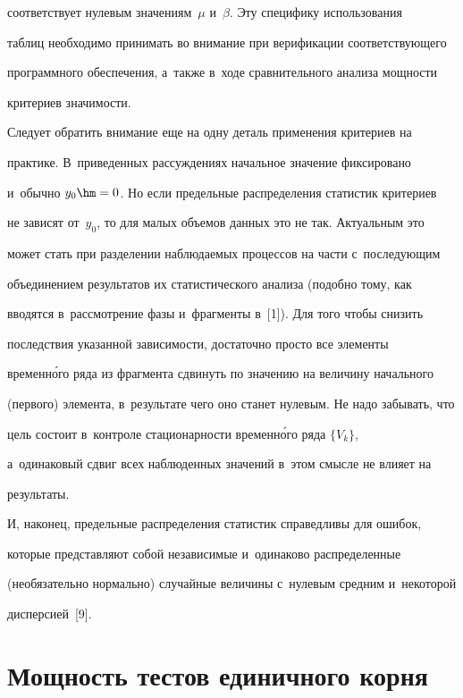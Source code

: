 соответствует нулевым значениям~$\mu$ и~$\beta$. Эту специфику использования 


таб\-лиц необходимо принимать во внимание при верификации со\-от\-вет\-ст\-ву\-юще\-го 


программного обеспечения, а~также в~ходе сравнительного анализа мощ\-ности 


критериев зна\-чи\-мости.


     


     Следует обратить внимание еще на одну деталь применения критериев на 


практике. В~приведенных рас\-суж\-де\-ни\-ях начальное значение фиксировано 


и~обычно $y_0\hm=0$. Но если предельные распределения статистик критериев 


не зависят от~$y_0$, то для малых объемов данных это не так. Актуальным это 


может стать при разделении наблюдаемых процессов на части с~по\-сле\-ду\-ющим 


объединением результатов их статистического анализа (подобно тому, как 


вводятся в~рас\-смот\-ре\-ние фазы и~фрагменты в~[1]). Для того чтобы снизить 


последствия указанной за\-ви\-си\-мости, до\-ста\-точ\-но прос\-то все элементы 


временн\'{о}го ряда из фрагмента сдвинуть по значению на величину начального 


(первого) элемента, в~результате чего оно станет нулевым. Не надо забывать, что 


цель со\-сто\-ит в~контроле стационарности временн\'{о}го ряда $\{V_k\}$, 


а~одинаковый сдвиг всех наблюденных значений в~этом смыс\-ле не влияет на 


результаты. 


     


     И, наконец, предельные распределения статистик справедливы для ошибок, 


которые пред\-став\-ля\-ют собой независимые и~одинаково распределенные 


(необязательно нормально) случайные величины с~нулевым средним и~некоторой 


дисперсией~[9].


     


\section{Мощность тестов единичного корня}





